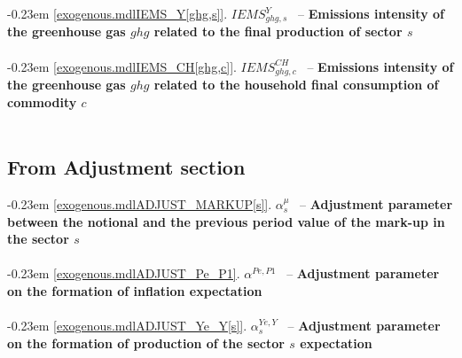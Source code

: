 \documentclass[12pt]{article}
\numberwithin{equation}{section}
\begin{document}
\noindent \kern-0.23em \noindent \begingroup {} \label{exogenous.mdlIEMS_Y[ghg,s]}\ref{exogenous.mdlIEMS_Y[ghg,s]}.
         
        \ensuremath{IEMS^{Y}_{ghg, s}}~ \endgroup -- \noindent \textbf{Emissions intensity of the greenhouse gas $ghg$ related to the final production of sector $s$}  \\ \\[-8pt]


\noindent \kern-0.23em \noindent \begingroup {} \label{exogenous.mdlIEMS_CH[ghg,c]}\ref{exogenous.mdlIEMS_CH[ghg,c]}.
         
        \ensuremath{IEMS^{CH}_{ghg, c}}~ \endgroup -- \noindent \textbf{Emissions intensity of the greenhouse gas $ghg$ related to the household final consumption of commodity $c$}  \\ \\[-8pt]











\subsection{From Adjustment section}




\noindent \kern-0.23em \noindent \begingroup {} \label{exogenous.mdlADJUST_MARKUP[s]}\ref{exogenous.mdlADJUST_MARKUP[s]}.
         
        \ensuremath{\alpha^{\mu}_{s}}~ \endgroup -- \noindent \textbf{Adjustment  parameter between the notional and the previous period value of the mark-up in the sector $s$}  \\ \\[-8pt]


\noindent \kern-0.23em \noindent \begingroup {} \label{exogenous.mdlADJUST_Pe_P1}\ref{exogenous.mdlADJUST_Pe_P1}.
         
        \ensuremath{\alpha^{Pe,P1}}~ \endgroup -- \noindent \textbf{Adjustment parameter on the formation of inflation expectation}  \\ \\[-8pt]


\noindent \kern-0.23em \noindent \begingroup {} \label{exogenous.mdlADJUST_Ye_Y[s]}\ref{exogenous.mdlADJUST_Ye_Y[s]}.
         
        \ensuremath{\alpha^{Ye,Y}_{s}}~ \endgroup -- \noindent \textbf{Adjustment parameter on the formation of production of the sector $s$ expectation}  \\ \\[-8pt]
\end{document}
